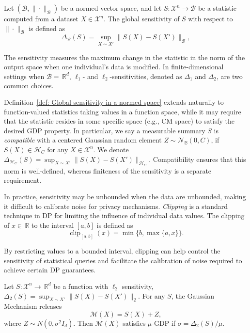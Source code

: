 \documentclass[twoside,11pt]{article}
\newcommand\R{\,{\mathbb{R}}}   %
\begin{document}
\begin{definition}
\label{def: Global sensitivity in a normed space}
Let $(\mathcal{B}, \|\cdot\|_{\mathcal{B}})$ be a normed vector space, and let $S: \mathcal{X}^n \to \mathcal{B}$ be a statistic computed from a dataset $X \in \mathcal{X}^n$. The global sensitivity of $S$ with respect to $\|\cdot\|_{\mathcal{B}}$ is defined as
\[
\Delta_{\mathcal{B}}(S)
=
\sup_{X\sim X'}
\|S(X)-S(X')\|_{\mathcal{B}},
\]
\end{definition}

The sensitivity measures the maximum change in the statistic in the norm of the output space when one individual's data is modified. In finite-dimensional settings when $\mathcal{B} = \R^d$, $\ell_1$- and $\ell_2$-sensitivities, denoted as $\Delta_1$ and $\Delta_2$, are two common choices. 

Definition~\ref{def: Global sensitivity in a normed space} extends naturally to function-valued statistics taking values in a function space, while it may require that the statistic resides in some specific space (e.g., CM space) to satisfy the desired GDP property. In particular, we say a measurable summary $S$ is \emph{compatible} with a centered Gaussian random element $Z\sim \mathcal{N}_{\mathbb{B}}(0,C)$, if $S(X)\in\mathcal{H}_C$ for any $X\in \mathcal{X}^n$. We denote $\Delta_{\mathcal{H}_C}(S) = \sup_{X\sim X'} \|S(X)-S(X')\|_{\mathcal{H}_C}$. Compatibility ensures that this norm is well-defined, whereas finiteness of the sensitivity is a separate requirement.

In practice, sensitivity may be unbounded when the data are unbounded, making it difficult to calibrate noise for privacy mechanisms. \emph{Clipping} is a standard technique in DP for limiting the influence of individual data values. The clipping of $x\in \R$ to the interval $[a,b]$ is defined as
\[
\operatorname{clip}_{[a,b]}(x) = \min\{b,\max\{a,x\}\}.
\]

By restricting values to a bounded interval, clipping can help control the sensitivity of statistical queries and facilitate the calibration of noise required to achieve certain DP guarantees.

\begin{proposition}
    Let $S: \mathcal{X}^n \to \R^d$ be a function with $\ell_2$ sensitivity, $\Delta_2(S) = \sup_{X\sim X'} \|S(X)-S(X')\|_2$.
    For any $S$, the Gaussian Mechanism releases
    \[
    \mathcal{M}(X)=S(X)+Z,
    \]
    where $Z\sim N(0,\sigma^2 I_d)$. Then $\mathcal{M}(X)$ satisfies $\mu$-GDP if $\sigma = \Delta_2(S)/\mu$.
\end{proposition}
\end{document}
